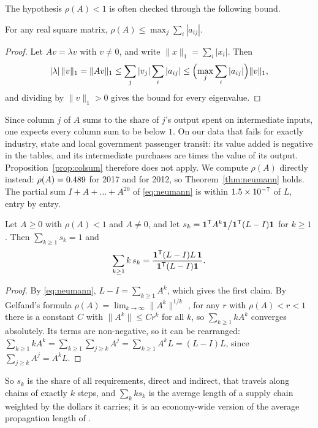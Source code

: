 The hypothesis $\rho(A)<1$ is often checked through the following bound.

\begin{proposition}\label{prop:colsum}
For any real square matrix, $\rho(A)\le\max_j\sum_i|a_{ij}|$.
\end{proposition}

\begin{proof}
Let $Av=\lambda v$ with $v\ne0$, and write $\|x\|_1=\sum_i|x_i|$. Then
\[
  |\lambda|\,\|v\|_1=\|Av\|_1\le\sum_j|v_j|\sum_i|a_{ij}|
  \le\Bigl(\max_j\sum_i|a_{ij}|\Bigr)\|v\|_1 ,
\]
and dividing by $\|v\|_1>0$ gives the bound for every eigenvalue.
\end{proof}

Since column $j$ of $A$ sums to the share of $j$'s output spent on
intermediate inputs, one expects every column sum to be below $1$. On our data
that fails for exactly \NColAboveOne{} industry, state and local government
passenger transit: its value added is negative in the tables, and its
intermediate purchases are \MaxColSum{} times the value of its output.
Proposition~\ref{prop:colsum} therefore does not apply. We compute $\rho(A)$ directly instead:
$\rho(A)=0.489$ for 2017 and \RhoTwelve{} for 2012, so
Theorem~\ref{thm:neumann} holds. The partial sum $I+A+\dots+A^{20}$ of
\eqref{eq:neumann} is within $1.5\times 10^{-7}$ of $L$, entry by entry.

\begin{proposition}
\label{prop:chain-length}
Let $A\ge0$ with $\rho(A)<1$ and $A\ne0$, and let
$s_k=\mathbf{1}^{\mathsf T}A^k\mathbf{1}\big/\mathbf{1}^{\mathsf T}(L-I)\mathbf{1}$ for $k\ge1$. Then
$\sum_{k\ge1}s_k=1$ and
\[
  \sum_{k\ge1}k\,s_k=\frac{\mathbf{1}^{\mathsf T}(L-I)L\,\mathbf{1}}{\mathbf{1}^{\mathsf T}(L-I)\mathbf{1}}.
\]
\end{proposition}

\begin{proof}
By \eqref{eq:neumann}, $L-I=\sum_{k\ge1}A^k$, which gives the first claim.
By Gelfand's formula $\rho(A)=\lim_{k\to\infty}\lVert A^k\rVert^{1/k}$
\cite[Sec.~5.6]{horn2013}, for any $r$ with $\rho(A)<r<1$ there is a constant
$C$ with $\lVert A^k\rVert\le Cr^k$ for all $k$, so $\sum_{k\ge1}kA^{k}$
converges absolutely. Its terms are non-negative, so it can be rearranged:
$\sum_{k\ge1}kA^k=\sum_{k\ge1}\sum_{j\ge k}A^j=\sum_{k\ge1}A^k L=(L-I)L$,
since $\sum_{j\ge k}A^j=A^kL$.
\end{proof}

So $s_k$ is the share of all requirements, direct and indirect, that travels
along chains of exactly $k$ steps, and $\sum_k k s_k$ is the average length of
a supply chain weighted by the dollars it carries; it is an economy-wide
version of the average propagation length of \cite{dietzenbacher2005}.


